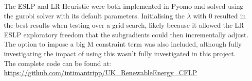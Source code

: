 The ESLP and LR Heuristic were both implemented in Pyomo \cite{bynum2021pyomo} 
and solved using the gurobi solver with its default parameters. Initialising the $\lambda$ with $0$ 
resulted in the best results when testing over a grid search, likely because it allowed the LR ESLP 
exploratory freedom that the subgradients could then incrementally adjust.
The option to impose a big M constraint term was also included, although fully investigating the impact of using this wasn't fully investigated in this project.
The complete code can be found at: \href{https://github.com/intimantripp/UK_RenewableEnergy_CFLP}{https://github.com/intimantripp/UK\_RenewableEnergy\_CFLP}
